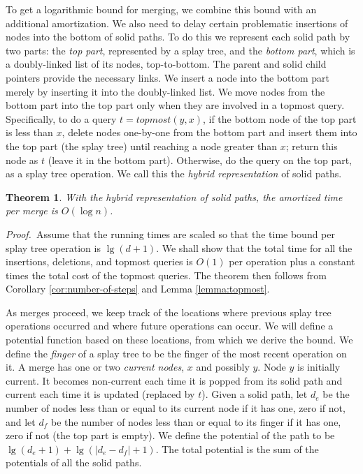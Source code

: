 \documentclass[twoside,leqno,twocolumn]{article}
\newtheorem{theorem}{Theorem}
\newcommand{\proof}{\noindent \emph{Proof.}\ }
\begin{document}
To get a logarithmic bound for merging, we combine this bound with an additional amortization.  We also need to delay certain problematic insertions of nodes into the bottom of solid paths.  To do this we represent each solid path by two parts: the \emph{top part}, represented by a splay tree, and the \emph{bottom part}, which is a doubly-linked list of its nodes, top-to-bottom.  The parent and solid child pointers provide the necessary links.  We insert a node into the bottom part merely by inserting it into the doubly-linked list.  We move nodes from the bottom part into the top part only when they are involved in a topmost query.  Specifically, to do a query $t = \mathit{topmost}(y, x)$, if the bottom node of the top part is less than $x$, delete nodes one-by-one from the bottom part and insert them into the top part (the splay tree) until reaching a node greater than $x$;  return this node as $t$ (leave it in the bottom part).  Otherwise, do the query on the top part, as a splay tree operation. We call this the \emph{hybrid representation} of solid paths.


\begin{theorem}
\label{theorem:splay}
With the hybrid representation of solid paths, the amortized time per merge is $O(\log n)$.
\end{theorem}
\proof Assume that the running times are scaled so that the time bound per splay tree operation is $\lg(d + 1)$.  We shall show that the total time for all the insertions, deletions, and topmost queries is $O(1)$ per operation plus a constant times the total cost of the topmost queries.  The theorem then follows from Corollary \ref{cor:number-of-steps} and Lemma \ref{lemma:topmost}.

As merges proceed, we keep track of the locations where previous splay tree operations occurred and where future operations can occur.  We will define a potential function based on these locations, from which we derive the bound.  We define the \emph{finger} of a splay tree to be the finger of the most recent operation on it. A merge has one or two \emph{current nodes}, $x$ and possibly $y$.  Node $y$ is initially current.  It becomes non-current each time it is popped from its solid path and current each time it is updated (replaced by $t$). Given a solid path, let $d_e$ be the number of nodes less than or equal to its current node if it has one, zero if not, and let $d_f$ be the number of nodes less than or equal to its finger if it has one, zero if not (the top part is empty). We define the potential of the path to be $\lg(d_e + 1) + \lg(|d_e - d_f| + 1)$.  The total potential is the sum of the potentials of all the solid paths.
\end{document}
